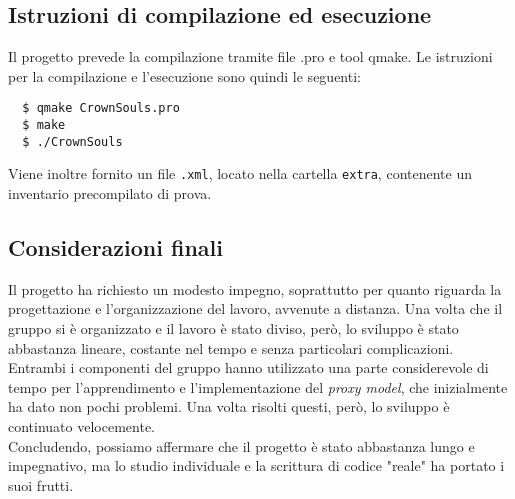 \subsection{Istruzioni di compilazione ed esecuzione}
Il progetto prevede la compilazione tramite file .pro e tool qmake. Le istruzioni per la compilazione e l'esecuzione sono quindi le seguenti:
\begin{center}
\centering
\begin{verbatim}
  $ qmake CrownSouls.pro
  $ make
  $ ./CrownSouls
\end{verbatim}
\end{center}

Viene inoltre fornito un file \texttt{.xml}, locato nella cartella \texttt{extra}, contenente un inventario precompilato di prova.

\subsection{Considerazioni finali}
Il progetto ha richiesto un modesto impegno, soprattutto per quanto riguarda la progettazione e l'organizzazione del lavoro, avvenute a distanza. Una volta che il gruppo si è organizzato e il lavoro è stato diviso, però, lo sviluppo è stato abbastanza lineare, costante nel tempo e senza particolari complicazioni. \\
Entrambi i componenti del gruppo hanno utilizzato una parte considerevole di tempo per l'apprendimento e l'implementazione del \textit{proxy model}, che inizialmente ha dato non pochi problemi. Una volta risolti questi, però, lo sviluppo è continuato velocemente. \\
Concludendo, possiamo affermare che il progetto è stato abbastanza lungo e impegnativo, ma lo studio individuale e la scrittura di codice "reale" ha portato i suoi frutti.
